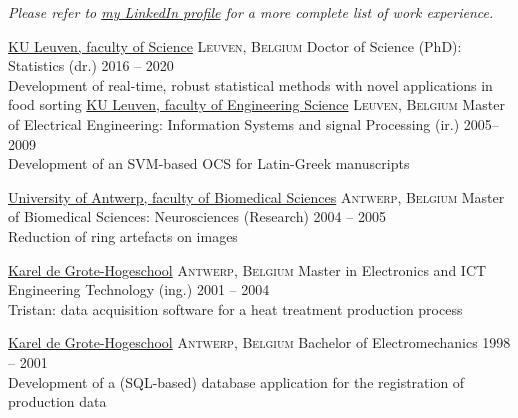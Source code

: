 \documentclass[10pt,a4paper]{article}
\begin{document}
\vspace{-0.2em}
\begin{center}
  \emph{\small Please refer to \href{http://www.linkedin.com/in/ivranckx}{my LinkedIn profile} for a more complete list of work experience.}
\end{center}


\spacedhrule{-0.2em}{-0.4em}


\headedsection
  {\href{https://wet.kuleuven.be/english}{KU Leuven, faculty of Science}}
  {\textsc{Leuven, Belgium}} {%
  \headedsubsection
    {Doctor of Science (PhD): Statistics (dr.)}
    {2016 -- 2020}{\\Development of real-time, robust statistical methods with novel applications in food sorting}
}
\vspace{+0.2em}
\headedsection
  {\href{https://eng.kuleuven.be/en}{KU Leuven, faculty of Engineering Science}}
  {\textsc{Leuven, Belgium}} {%
  \headedsubsection
    {Master of Electrical Engineering: Information Systems and signal Processing (ir.)}
    {2005--2009} {\\Development of an SVM-based OCS for Latin-Greek manuscripts}
}

\vspace{+0.2em}
\headedsection
  {\href{https://www.uantwerpen.be/en/}{University of Antwerp, faculty of Biomedical Sciences}}
  {\textsc{Antwerp, Belgium}} {%
  \headedsubsection
    {Master of Biomedical Sciences: Neurosciences (Research)}
    {2004 -- 2005} {\\Reduction of ring artefacts on  images}
}

\vspace{+0.2em}
\headedsection
{\href{https://www.kdg.be/}{Karel de Grote-Hogeschool}}
{\textsc{Antwerp, Belgium}} {%
	\headedsubsection
	{Master in Electronics and ICT Engineering Technology (ing.)}
	{2001 -- 2004} {\\Tristan: data acquisition software for a heat treatment production process}
}

\vspace{+0.2em}
\headedsection
{\href{https://www.kdg.be/}{Karel de Grote-Hogeschool}}
{\textsc{Antwerp, Belgium}} {%
	\headedsubsection
	{Bachelor of Electromechanics}
	{1998 -- 2001} {\\Development of a (SQL-based) database application for the registration of production data}
}

\spacedhrule{0.5em}{-0.4em}
\end{document}
